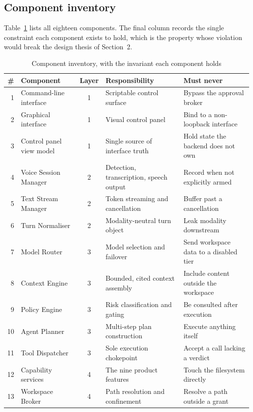 \documentclass[11pt]{article}
\begin{document}
\subsection{Component inventory}

Table~\ref{tab:components} lists all eighteen components. The final column records the
single constraint each component exists to hold, which is the property whose violation
would break the design thesis of Section~2.

\begin{table}[htbp]
\centering
\small
\caption{Component inventory, with the invariant each component holds}
\label{tab:components}
\begin{tabular}{@{}rp{}cp{}p{}@{}}
\toprule
\textbf{\#} & \textbf{Component} & \textbf{Layer} & \textbf{Responsibility} & \textbf{Must never} \\
\midrule
1 & Command-line interface & 1 & Scriptable control surface & Bypass the approval broker \\
2 & Graphical interface & 1 & Visual control panel & Bind to a non-loopback interface \\
3 & Control panel view model & 1 & Single source of interface truth & Hold state the backend does not own \\
4 & Voice Session Manager & 2 & Detection, transcription, speech output & Record when not explicitly armed \\
5 & Text Stream Manager & 2 & Token streaming and cancellation & Buffer past a cancellation \\
6 & Turn Normaliser & 2 & Modality-neutral turn object & Leak modality downstream \\
7 & Model Router & 3 & Model selection and failover & Send workspace data to a disabled tier \\
8 & Context Engine & 3 & Bounded, cited context assembly & Include content outside the workspace \\
9 & Policy Engine & 3 & Risk classification and gating & Be consulted after execution \\
10 & Agent Planner & 3 & Multi-step plan construction & Execute anything itself \\
11 & Tool Dispatcher & 3 & Sole execution chokepoint & Accept a call lacking a verdict \\
12 & Capability services & 4 & The nine product features & Touch the filesystem directly \\
13 & Workspace Broker & 4 & Path resolution and confinement & Resolve a path outside a grant \\

\end{tabular}
\end{table}
\end{document}
